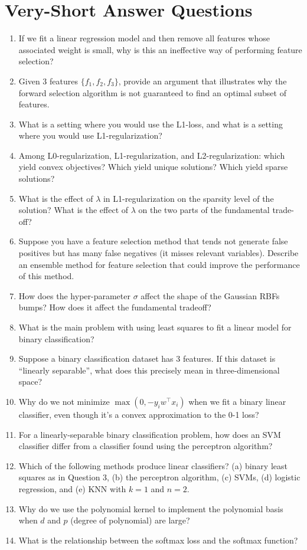 \documentclass{article}
\def\enum#1{\begin{enumerate}#1\end{enumerate}}
\begin{document}
\pagebreak

\section{Very-Short Answer Questions}

\enum{
\item If we fit a linear regression model and then remove all features whose associated weight is small, why is this an ineffective way of performing feature selection?
\item Given $3$ features $\{f_1, f_2, f_3\}$, provide an argument that illustrates why the forward selection algorithm is not guaranteed to find an optimal subset of features.
\item What is a setting where you would use the L1-loss, and what is a setting where you would use L1-regularization?
\item Among L0-regularization, L1-regularization, and L2-regularization: which yield convex objectives? Which yield unique solutions? Which yield sparse solutions?
\item What is the effect of $\lambda$ in L1-regularization on the sparsity level of the solution? What is the effect of $\lambda$ on the two parts of the fundamental trade-off?
\item Suppose you have a feature selection method that tends not generate false positives but has many false negatives (it misses relevant variables). Describe an ensemble method for feature selection that could improve the performance of this method.
\item How does the hyper-parameter $\sigma$ affect the shape of the Gaussian RBFs bumps? How does it affect the fundamental tradeoff?
\item What is the main problem with using least squares to fit a linear model for binary classification?
\item Suppose a binary classification dataset has 3 features. If this dataset is ``linearly separable'', what does this precisely mean in three-dimensional space?
\item Why do we not minimize $\max(0, -y_i w^\top x_i)$ when we fit a binary linear classifier, even though it’s a convex approximation to the 0-1 loss?
\item For a linearly-separable binary classification problem, how does an SVM classifier differ from a classifier found using the perceptron algorithm?
\item Which of the following methods produce linear classifiers? (a) binary least squares as in Question 3, (b) the perceptron algorithm, (c) SVMs, (d) logistic regression, and (e) KNN with $k=1$ and $n=2$.
\item Why do we use the polynomial kernel to implement the polynomial basis when $d$ and $p$ (degree of polynomial) are large?
\item What is the relationship between the softmax loss and the softmax function?
}
\end{document}
